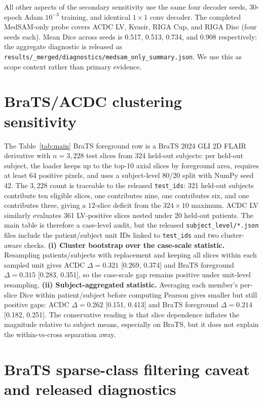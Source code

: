 All other aspects of the secondary sensitivity use the same four decoder seeds,
30-epoch Adam $10^{-3}$ training, and identical $1{\times}1$ conv decoder. The
completed MedSAM-only probe covers ACDC LV, Kvasir, RIGA Cup, and RIGA Disc
(four seeds each). Mean Dice across seeds is 0.517, 0.513, 0.734, and 0.908
respectively; the aggregate diagnostic is released as
\texttt{results/\_merged/diagnostics/medsam\_only\_summary.json}. We use this
as scope context rather than primary evidence.

\section{BraTS/ACDC clustering sensitivity}
\label{app:subject-cluster}
\label{app:brats-bootstrap-caveat}

The Table~\ref{tab:main} BraTS foreground row is a BraTS 2024 GLI 2D FLAIR derivative with $n{=}3{,}228$ test slices from 324 held-out subjects: per held-out subject, the loader keeps up to the top-10 axial slices by foreground area, requires at least 64 positive pixels, and uses a subject-level 80/20 split with NumPy seed 42. The $3{,}228$ count is traceable to the released \texttt{test\_ids}: 321 held-out subjects contribute ten eligible slices, one contributes nine, one contributes six, and one contributes three, giving a $12$-slice deficit from the $324{\times}10$ maximum. ACDC LV similarly evaluates 361 LV-positive slices nested under 20 held-out patients. The main table is therefore a case-level audit, but the released \texttt{subject\_level/*.json} files include the patient/subject unit IDs linked to \texttt{test\_ids} and two cluster-aware checks. \textbf{(i) Cluster bootstrap over the case-scale statistic.} Resampling patients/subjects with replacement and keeping all slices within each sampled unit gives ACDC $\Delta{=}0.321$ [0.269, 0.374] and BraTS foreground $\Delta{=}0.315$ [0.283, 0.351], so the case-scale gap remains positive under unit-level resampling. \textbf{(ii) Subject-aggregated statistic.} Averaging each member's per-slice Dice within patient/subject before computing Pearson gives smaller but still positive gaps: ACDC $\Delta{=}0.262$ [0.151, 0.413] and BraTS foreground $\Delta{=}0.214$ [0.182, 0.251]. The conservative reading is that slice dependence inflates the magnitude relative to subject means, especially on BraTS, but it does not explain the within-vs-cross separation away.

\section{BraTS sparse-class filtering caveat and released diagnostics}
\label{app:brats-ablations}

